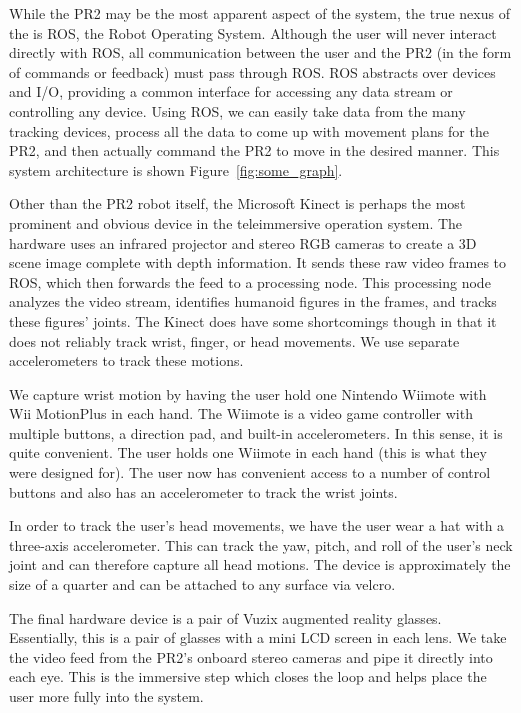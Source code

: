 \documentclass{sig-alternate}
\begin{document}
While the PR2 may be the most apparent aspect of the system,
the true nexus of the is ROS, the Robot Operating System. Although the
user will never interact directly with ROS, all communication between the
user and the PR2 (in the form of commands or feedback) must pass through ROS.
ROS abstracts over devices and I/O, providing a common interface for accessing
any data stream or controlling any device. Using ROS, we can easily take
data from the many tracking devices, process all the data to come up with
movement plans for the PR2, and then actually command the PR2 to move in the
desired manner. This system architecture is shown Figure~\ref{fig:some_graph}.

Other than the PR2 robot itself, the Microsoft Kinect is perhaps the most 
prominent and obvious device in the teleimmersive operation system. The
hardware uses an 
infrared projector and stereo RGB cameras to create a 3D scene image complete
with depth information. It sends these raw video frames to ROS, which then
forwards the feed to a processing node. This processing node analyzes the 
video stream, identifies humanoid figures in the frames, and tracks these 
figures' joints. The Kinect does have some shortcomings though in that it does 
not reliably track wrist, finger, or head movements. We use separate 
accelerometers to track these motions.

We capture wrist motion by having the user hold one Nintendo Wiimote with 
Wii MotionPlus in each hand. The Wiimote is a video game controller with 
multiple buttons, a direction pad, and built-in accelerometers. In this sense,
it is quite convenient. The user holds one Wiimote in each hand (this is 
what they were designed for). The user now has convenient access to a number of
control buttons and also has an accelerometer to track the wrist joints.

In order to track the user's head movements, we have the user wear a hat
with a three-axis accelerometer. This can track the yaw, pitch, and roll of the
user's neck joint and can therefore capture all head motions. The device is
approximately the size of a quarter and can be attached to any surface via
velcro.

The final hardware device is a pair of Vuzix augmented reality glasses.
Essentially, this is a pair of glasses with a mini LCD screen in each lens.
We take the video feed from the PR2's onboard stereo cameras and pipe it
directly into each eye. This is the immersive step which closes the loop and
helps place the user more fully into the system.
\end{document}
